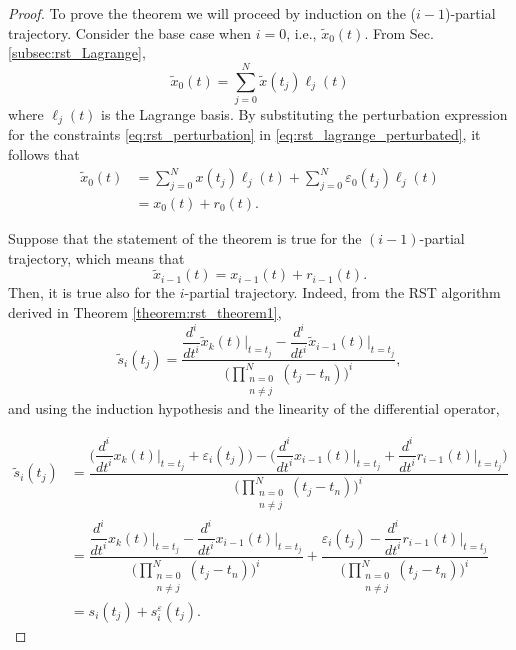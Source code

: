 \begin{proof}
To prove the theorem we will proceed by induction on the ($i-1$)-partial trajectory. Consider the base case when $i=0$, i.e., $\tilde{x}_0(t)$. From Sec. \ref{subsec:rst_Lagrange}, 
\begin{equation}
\label{eq:rst_lagrange_perturbated}
\tilde{x}_0(t) = \sum_{j=0}^{N}{\tilde{x}(t_j) \ell_j(t)}
\end{equation}
where $\ell_j(t)$ is the Lagrange basis. By substituting the perturbation expression for the constraints \eqref{eq:rst_perturbation} in \eqref{eq:rst_lagrange_perturbated}, it follows that 
\begin{align}
\tilde{x}_0(t) & = \sum_{j=0}^{N}{x(t_j) \ell_j(t)}+\sum_{j=0}^{N}{\varepsilon_0(t_j) \ell_j(t)} \nonumber \\ 
& = x_0(t)+r_0(t).
\end{align}

Suppose that the statement of the theorem is true for the $(i-1)$-partial trajectory, which means that
\begin{equation}
\tilde{x}_{i-1}(t)= x_{i-1}(t)+r_{i-1}(t).
\end{equation}
Then, it is true also for the $i$-partial trajectory. Indeed, from the RST algorithm derived in Theorem \ref{theorem:rst_theorem1},
\begin{equation}
\tilde{s}_i(t_j)=\dfrac{\dfrac{d^i}{dt^i}\tilde{x}_k(t)\biggr|_{t=t_j} -\dfrac{d^i}{dt^i}\tilde{x}_{i-1}(t)\biggr|_{t=t_j}}{\displaystyle \Biggl(\prod_{\substack{n=0\\ n\neq j}}^{N}{(t_j-t_n)}\Biggr)^i},
\label{eq:rst_perturbed_recursive}
\end{equation}
and using the induction hypothesis and the linearity of the differential operator,

\begin{align}
\tilde{s}_i(t_j)& = \dfrac{\Biggl(\dfrac{d^i}{dt^i}x_k(t)\biggr|_{t=t_j}+\varepsilon_i(t_j)\Biggr) -\Biggl(\dfrac{d^i}{dt^i}x_{i-1}(t)\biggr|_{t=t_j}+\dfrac{d^i}{dt^i}r_{i-1}(t)\biggr|_{t=t_j}\Biggr)}{\displaystyle \Biggl(\prod_{\substack{n=0\\ n\neq j}}^{N}{(t_j-t_n)}\Biggr)^i} \nonumber \\
&= \dfrac{\dfrac{d^i}{dt^i}x_k(t)\biggr|_{t=t_j}-\dfrac{d^i}{dt^i}x_{i-1}(t)\biggr|_{t=t_j}}{\displaystyle \Biggl(\prod_{\substack{n=0\\ n\neq j}}^{N}{(t_j-t_n)}\Biggr)^i}+\dfrac{\varepsilon_i(t_j)-\dfrac{d^i}{dt^i}r_{i-1}(t)\biggr|_{t=t_j}}{\displaystyle \Biggl(\prod_{\substack{n=0\\ n\neq j}}^{N}{(t_j-t_n)}\Biggr)^i} \nonumber \\
&= s_i(t_j)+s_i^{\varepsilon}(t_j).
\end{align}


\end{proof}
